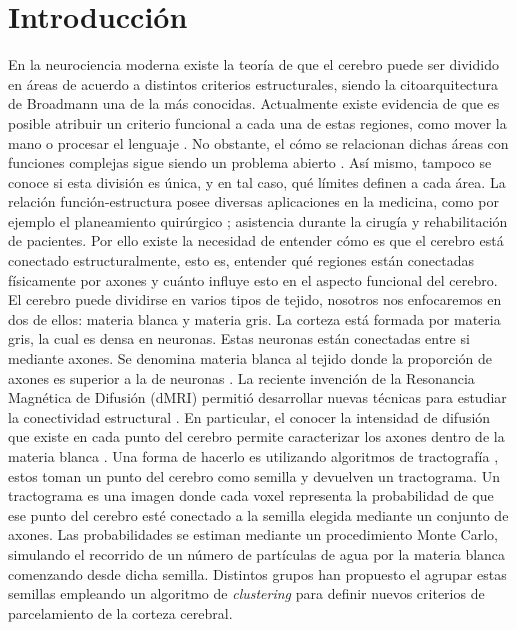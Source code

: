 \chapter{Introducci\'on}

En la neurociencia moderna existe la teor\'ia de que el cerebro
puede ser dividido en \'areas de acuerdo a distintos criterios estructurales,
siendo la citoarquitectura de Broadmann \cite{Brodmann1909} una de la m\'as conocidas.
Actualmente existe evidencia de que es posible atribuir un criterio funcional
a cada una de estas regiones, como mover la mano o procesar el lenguaje
\cite{Greicius2003}. No obstante, el c\'omo se relacionan dichas \'areas con funciones
complejas sigue siendo un problema abierto \cite{Barch2013}. As\'i mismo, tampoco
se conoce si esta divisi\'on es \'unica, y en tal caso, qu\'e l\'imites definen
a cada \'area. La relaci\'on funci\'on-estructura posee diversas aplicaciones en la
medicina, como por ejemplo el planeamiento quir\'urgico \cite{Stufflebeam2011}
\cite{Oishi2010}; asistencia durante la cirug\'ia \cite{DeSchotten2005} y rehabilitaci\'on
\cite{Song2014} de pacientes. Por ello existe la necesidad de entender c\'omo es
que el cerebro est\'a conectado estructuralmente, esto es, entender qu\'e regiones
est\'an conectadas f\'isicamente por axones y cu\'anto influye esto en el aspecto
funcional del cerebro. \\

El cerebro puede dividirse en varios tipos de tejido, nosotros nos enfocaremos en
dos de ellos: materia blanca y materia gris. La corteza est\'a formada por 
materia gris, la cual es densa en neuronas. Estas neuronas est\'an conectadas 
entre si mediante axones. Se denomina materia blanca al tejido donde la 
proporci\'on de axones es superior a la de neuronas \cite{Dale2008}. La reciente
invenci\'on de la Resonancia Magn\'etica de Difusi\'on (dMRI) permiti\'o
desarrollar nuevas t\'ecnicas para estudiar la conectividad estructural \cite{Taylor1985}. 
En particular, el conocer la intensidad de difusi\'on que existe en cada punto del 
cerebro permite caracterizar los axones dentro de la materia blanca \cite{Hagmann2006}.
Una forma de hacerlo es utilizando algoritmos de tractograf\'ia \cite{Descoteaux2009}
\cite{Jbabdi2007}, estos toman un punto del cerebro como semilla y devuelven un
tractograma. Un tractograma es una imagen donde cada voxel representa la
probabilidad de que ese punto del cerebro est\'e conectado a la semilla elegida
mediante un conjunto de axones. Las probabilidades se estiman mediante un 
procedimiento Monte Carlo, simulando el recorrido de un n\'umero de part\'iculas
de agua por la materia blanca comenzando desde dicha semilla. Distintos grupos
han propuesto el agrupar estas semillas empleando un algoritmo de \textit{clustering}
para definir nuevos criterios de parcelamiento de la corteza cerebral. \\

